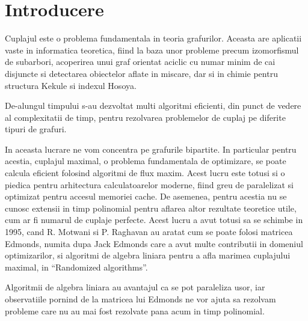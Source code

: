 \chapter{Introducere}

Cuplajul este o problema fundamentala in teoria grafurilor. Aceasta are
aplicatii vaste in informatica teoretica, fiind la baza unor probleme precum
izomorfismul de subarbori, acoperirea unui graf orientat aciclic cu numar minim
de cai disjuncte si detectarea obiectelor aflate in miscare, dar si in chimie
pentru structura Kekule si indexul Hosoya. \par %

De-alungul timpului s-au dezvoltat multi algoritmi eficienti, din punct de
vedere al complexitatii de timp, pentru rezolvarea problemelor de cuplaj pe
diferite tipuri de grafuri. \par

In aceasta lucrare ne vom concentra pe grafurile bipartite. In particular pentru
acestia, cuplajul maximal, o problema fundamentala de optimizare, se poate
calcula eficient folosind algoritmi de flux maxim. Acest lucru este totusi si o
piedica pentru arhitectura calculatoarelor moderne, fiind greu de paralelizat si
optimizat pentru accesul memoriei cache. De asemenea, pentru acestia nu se
cunosc extensii in timp polinomial pentru aflarea altor rezultate teoretice
utile, cum ar fi numarul de cuplaje perfecte. Acest lucru a avut totusi sa se
schimbe in 1995, cand R. Motwani si P. Raghavan au aratat cum se poate folosi
matricea Edmonds, numita dupa Jack Edmonds care a avut multe contributii in
domeniul optimizarilor, si algoritmi de algebra liniara pentru a afla marimea
cuplajului maximal, in ``Randomized algorithms''\cite{randomizedalgorithms}. \par

Algoritmii de algebra liniara au avantajul ca se pot paraleliza usor, iar
observatiile pornind de la matricea lui Edmonds ne vor ajuta sa rezolvam
probleme care nu au mai fost rezolvate pana acum in timp polinomial. \par
